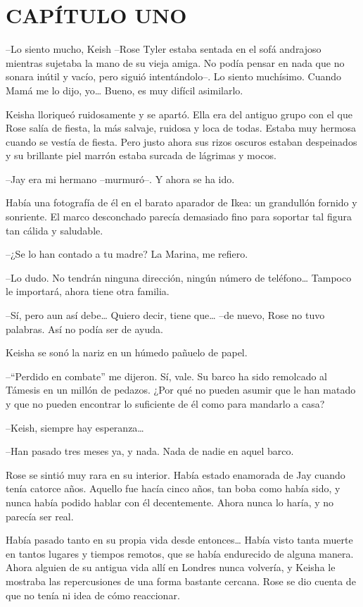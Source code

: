 \chapter*{CAPÍTULO UNO}

{--Lo siento mucho, Keish --Rose Tyler estaba sentada en el sofá
 andrajoso mientras sujetaba la mano de su vieja amiga. No podía pensar
 en nada que no sonara inútil y vacío, pero siguió intentándolo--. Lo
 siento muchísimo. Cuando Mamá me lo dijo, yo\ldots{} Bueno, es muy
difícil asimilarlo.}

{Keisha lloriqueó ruidosamente y se apartó. Ella era del antiguo grupo
 con el que Rose salía de fiesta, la más salvaje, ruidosa y loca de
 todas. Estaba muy hermosa cuando se vestía de fiesta. Pero justo ahora
 sus rizos oscuros estaban despeinados y su brillante piel marrón estaba
surcada de lágrimas y mocos.}

{--Jay era mi hermano --murmuró--. Y ahora se ha ido.}

{Había una fotografía de él en el barato aparador de Ikea: un grandullón
 fornido y sonriente. El marco desconchado parecía demasiado fino para
soportar tal figura tan cálida y saludable. }

{--¿Se lo han contado a tu madre? La Marina, me refiero.}

{--Lo dudo. No tendrán ninguna dirección, ningún número de
 teléfono\ldots{} Tampoco le importará, ahora tiene otra familia.}

{--Sí, pero aun así debe\ldots{} Quiero decir, tiene que\ldots{} --de
nuevo, Rose no tuvo palabras. Así no podía ser de ayuda.}

{Keisha se sonó la nariz en un húmedo pañuelo de papel.}

{--``Perdido en combate'' me dijeron. Sí, vale. Su barco ha sido
 remolcado al Támesis en un millón de pedazos. ¿Por qué no pueden asumir
 que le han matado y que no pueden encontrar lo suficiente de él como
para mandarlo a casa?}

{--Keish, siempre hay esperanza\ldots{}}

{--Han pasado tres meses ya, y nada. Nada de nadie en aquel barco.}

{Rose se sintió muy rara en su interior. Había estado enamorada de Jay
 cuando tenía catorce años. Aquello fue hacía cinco años, tan boba como
 había sido, y nunca había podido hablar con él decentemente. Ahora nunca
lo haría, y no parecía ser real.}

{Había pasado tanto en su propia vida desde entonces\ldots{} Había visto
 tanta muerte en tantos lugares y tiempos remotos, que se había
 endurecido de alguna manera. Ahora alguien de su antigua vida allí en
 Londres nunca volvería, y Keisha le mostraba las repercusiones de una
 forma bastante cercana. Rose se dio cuenta de que no tenía ni idea de
cómo reaccionar.}

